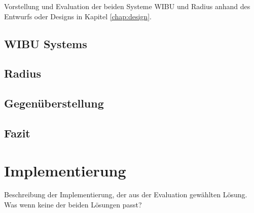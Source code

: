 \documentclass[11pt,a4paper]{report}
\begin{document}
Vorstellung und Evaluation der beiden Systeme WIBU und Radius anhand des Entwurfs oder Designs in Kapitel \ref{chap:design}.

\section{WIBU Systems}

\section{Radius}

\section{Gegenüberstellung}

\section{Fazit}

\chapter{Implementierung} \label{chap:implementation}

Beschreibung der Implementierung, der aus der Evaluation gewählten Lösung. Was wenn keine der beiden Lösungen passt?
\end{document}
